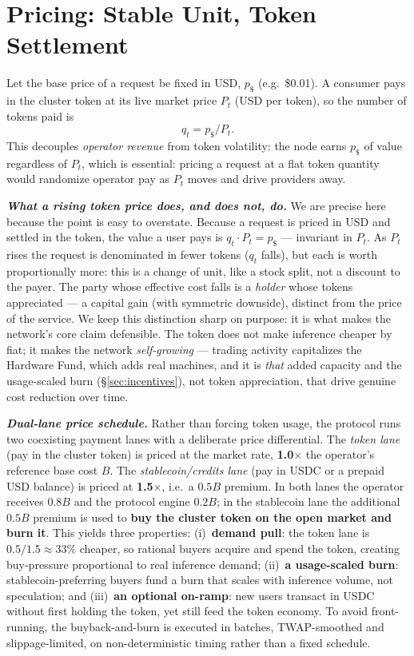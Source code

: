 \documentclass[11pt]{article}
\newcommand{\ph}[1]{\textbf{\textit{#1}}}
\begin{document}
\section{Pricing: Stable Unit, Token Settlement}
Let the base price of a request be fixed in USD, $p_{\$}$ (e.g.\ \$0.01). A consumer pays in the cluster token at its live market price $P_t$ (USD per token), so the number of tokens paid is
\begin{equation}
q_t = p_{\$} / P_t .
\end{equation}
This decouples \textit{operator revenue} from token volatility: the node earns $p_{\$}$ of value regardless of $P_t$, which is essential: pricing a request at a flat token quantity would randomize operator pay as $P_t$ moves and drive providers away.

\ph{What a rising token price does, and does not, do.} We are precise here because the point is easy to overstate. Because a request is priced in USD and settled in the token, the value a user pays is $q_t \cdot P_t = p_{\$}$ --- invariant in $P_t$. As $P_t$ rises the request is denominated in fewer tokens ($q_t$ falls), but each is worth proportionally more: this is a change of unit, like a stock split, not a discount to the payer. The party whose effective cost falls is a \textit{holder} whose tokens appreciated --- a capital gain (with symmetric downside), distinct from the price of the service. We keep this distinction sharp on purpose: it is what makes the network's core claim defensible. The token does not make inference cheaper by fiat; it makes the network \textit{self-growing} --- trading activity capitalizes the Hardware Fund, which adds real machines, and it is \textit{that} added capacity and the usage-scaled burn (\S\ref{sec:incentives}), not token appreciation, that drive genuine cost reduction over time.


\ph{Dual-lane price schedule.} Rather than forcing token usage, the protocol runs two coexisting payment lanes with a deliberate price differential. The \textit{token lane} (pay in the cluster token) is priced at the market rate, \textbf{1.0$\times$} the operator's reference base cost $B$. The \textit{stablecoin/credits lane} (pay in USDC or a prepaid USD balance) is priced at \textbf{1.5$\times$}, i.e.\ a $0.5B$ premium. In both lanes the operator receives $0.8B$ and the protocol engine $0.2B$; in the stablecoin lane the additional $0.5B$ premium is used to \textbf{buy the cluster token on the open market and burn it}. This yields three properties: (i)~\textbf{demand pull}: the token lane is $0.5/1.5\approx 33\%$ cheaper, so rational buyers acquire and spend the token, creating buy-pressure proportional to real inference demand; (ii)~\textbf{a usage-scaled burn}: stablecoin-preferring buyers fund a burn that scales with inference volume, not speculation; and (iii)~\textbf{an optional on-ramp}: new users transact in USDC without first holding the token, yet still feed the token economy. To avoid front-running, the buyback-and-burn is executed in batches, TWAP-smoothed and slippage-limited, on non-deterministic timing rather than a fixed schedule.
\end{document}
